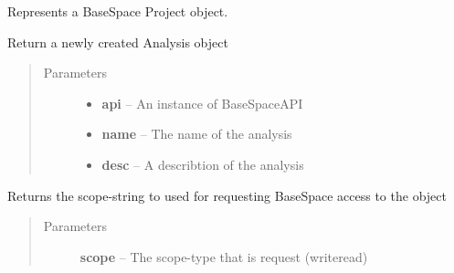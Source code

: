 \documentclass[letterpaper,10pt,english]{sphinxmanual}
\begin{document}
\begin{fulllineitems}
\label{Available modules:BaseSpacePy.model.Project.Project}
Represents a BaseSpace Project object.

\begin{fulllineitems}
\label{Available modules:BaseSpacePy.model.Project.Project.createAnalysis}
Return a newly created Analysis object
\begin{quote}\begin{description}
\item[{Parameters}] \leavevmode\begin{itemize}
\item {} 
\textbf{api} -- An instance of BaseSpaceAPI

\item {} 
\textbf{name} -- The name of the analysis

\item {} 
\textbf{desc} -- A describtion of the analysis

\end{itemize}

\end{description}\end{quote}

\end{fulllineitems}


\begin{fulllineitems}
\label{Available modules:BaseSpacePy.model.Project.Project.getAccessStr}
Returns the scope-string to used for requesting BaseSpace access to the object
\begin{quote}\begin{description}
\item[{Parameters}] \leavevmode
\textbf{scope} -- The scope-type that is request (write\textbar{}read)

\end{description}\end{quote}

\end{fulllineitems}



\end{fulllineitems}
\end{document}
